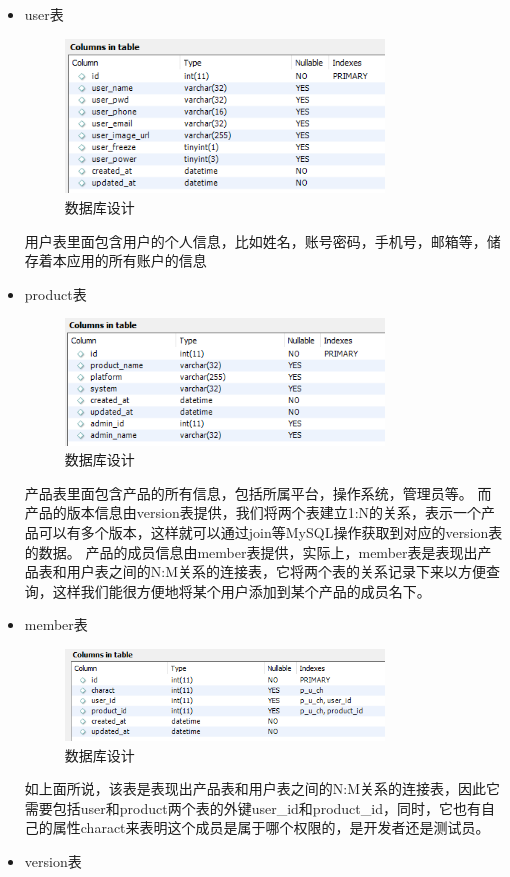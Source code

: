 \begin{itemize}
	\item user表 
	
	\begin{figure}[h]
		\centering
		\includegraphics[width=0.8\textwidth]{image/database/users.png}
		\caption{数据库设计}
		\label{fig:u}
	\end{figure}
	用户表里面包含用户的个人信息，比如姓名，账号密码，手机号，邮箱等，储存着本应用的所有账户的信息
	\item product表 
		\begin{figure}[h]
		\centering
		\includegraphics[width=0.8\textwidth]{image/database/product.png}
		\caption{数据库设计}
		\label{fig:p}
	\end{figure}
	产品表里面包含产品的所有信息，包括所属平台，操作系统，管理员等。
	而产品的版本信息由version表提供，我们将两个表建立1:N的关系，表示一个产品可以有多个版本，这样就可以通过join等MySQL操作获取到对应的version表的数据。
	产品的成员信息由member表提供，实际上，member表是表现出产品表和用户表之间的N:M关系的连接表，它将两个表的关系记录下来以方便查询，这样我们能很方便地将某个用户添加到某个产品的成员名下。
	\item member表 
		\begin{figure}[h]
		\centering
		\includegraphics[width=0.8\textwidth]{image/database/member.png}
		\caption{数据库设计}
		\label{fig:database}
	\end{figure}
	如上面所说，该表是表现出产品表和用户表之间的N:M关系的连接表，因此它需要包括user和product两个表的外键user\_id和product\_id，同时，它也有自己的属性charact来表明这个成员是属于哪个权限的，是开发者还是测试员。
	\item version表 
	

\end{itemize}
